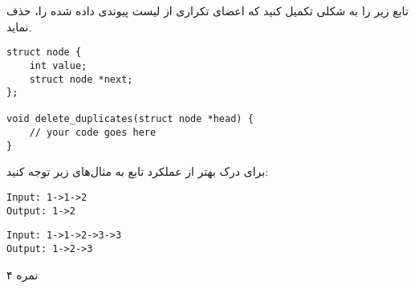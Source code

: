 \documentclass[../main.tex]{subfiles}
\begin{document}
تابع زیر را به شکلی تکمیل کنید که اعضای تکراری از لیست پیوندی داده شده را، حذف نماید.

\begin{latin}
\begin{verbatim}
struct node {
    int value;
    struct node *next;
};

void delete_duplicates(struct node *head) {
    // your code goes here
}
\end{verbatim}
\end{latin}

برای درک بهتر از عملکرد تابع به مثال‌های زیر توجه کنید:

\begin{latin}
\begin{verbatim}
Input: 1->1->2
Output: 1->2
\end{verbatim}

\begin{verbatim}
Input: 1->1->2->3->3
Output: 1->2->3
\end{verbatim}
\end{latin}

۴ نمره
\end{document}
